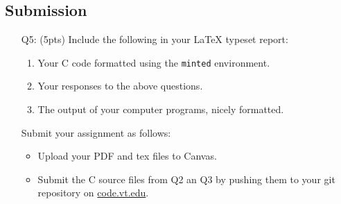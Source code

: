 \subsection*{Submission}
\begin{itemize}
    \item[Q5:] (5pts) Include the following in your \LaTeX{} typeset report:
    \begin{enumerate}
        \item Your C code formatted using the \texttt{minted} environment.
        \item Your responses to the above questions. 
        \item The output of your computer programs, nicely formatted.
    \end{enumerate}
 
    Submit your assignment as follows:
    \begin{itemize}
    \item Upload your PDF and tex files to Canvas.
    \item Submit the C source files from Q2 an Q3 by pushing them to your git repository on \href{code.vt.edu}{code.vt.edu}.
    \end{itemize}
\end{itemize}
